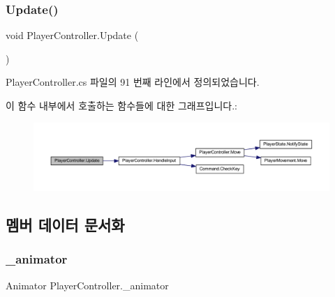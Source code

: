 \subsubsection{\texorpdfstring{Update()}{Update()}}
{\footnotesize\ttfamily void Player\+Controller.\+Update (\begin{DoxyParamCaption}{ }\end{DoxyParamCaption})\hspace{0.3cm}{\ttfamily [private]}}



Player\+Controller.\+cs 파일의 91 번째 라인에서 정의되었습니다.


\begin{DoxyCode}{0}

\end{DoxyCode}
이 함수 내부에서 호출하는 함수들에 대한 그래프입니다.\+:
\nopagebreak
\begin{figure}[H]
\begin{center}
\leavevmode
\includegraphics[width=350pt]{dc/dde/class_player_controller_ae8bc83dffb99867a04be016473ed2c43_cgraph}
\end{center}
\end{figure}


\subsection{멤버 데이터 문서화}
\mbox{\label{class_player_controller_ada29d77d333483963257e51a6e15b8ae}} 
\subsubsection{\texorpdfstring{\_animator}{\_animator}}
{\footnotesize\ttfamily Animator Player\+Controller.\+\_\+animator\hspace{0.3cm}{\ttfamily [private]}}



